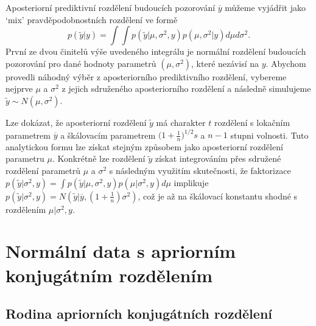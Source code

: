 Aposteriorní prediktivní rozdělení budoucích pozorování $\overline{y}$ můžeme vyjádřit jako `mix' pravděpodobnostních rozdělení ve formě
\begin{equation}
p(\tilde{y} | y) = \int \int p(\tilde{y} | \mu, \sigma^2, y) p(\mu, \sigma^2 | y) d \mu d \sigma^2.
\end{equation}
První ze dvou činitelů výše uvedeného integrálu je normální rozdělení budoucích pozorování pro dané hodnoty parametrů $(\mu, \sigma^2)$, které nezávisí na $y$. Abychom provedli náhodný výběr z aposteriorního prediktivního rozdělení, vybereme nejprve $\mu$ a $\sigma^2$ z jejich sdruženého aposteriorního rozdělení a následně simulujeme $\tilde{y} \sim N(\mu, \sigma^2)$.

Lze dokázat, že aposteriorní rozdělení $\tilde{y}$ má charakter $t$ rozdělení s lokačním parametrem $\overline{y}$ a škálovacím parametrem $\big(1 + \frac{1}{n}\big)^{1/2}s$ a $n - 1$ stupni volnosti. Tuto analytickou formu lze získat stejným způsobem jako aposteriorní rozdělení parametru $\mu$. Konkrétně lze rozdělení $\tilde{y}$ získat integrováním přes sdružené rozdělení parametrů $\mu$ a $\sigma^2$ s následným využitím skutečnosti, že faktorizace $p(\tilde{y} | \sigma^2, y) = \int p(\tilde{y} | \mu, \sigma^2, y) p(\mu | \sigma^2, y) d \mu$
 implikuje $p(\tilde{y} | \sigma^2 , y) = N(\tilde{y} | \overline{y}, (1 + \frac{1}{n}) \sigma^2 )$, což je až na škálovací konstantu shodné s rozdělením $\mu | \sigma^2, y$.
 
\section{Normální data s apriorním konjugátním rozdělením}

\subsection{Rodina apriorních konjugátních rozdělení}

